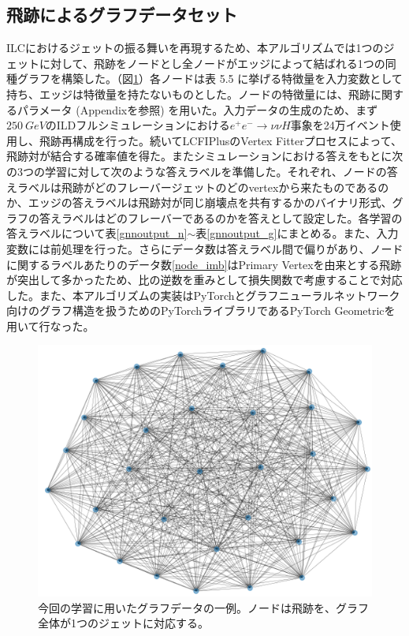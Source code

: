 \subsection{飛跡によるグラフデータセット}
ILCにおけるジェットの振る舞いを再現するため、本アルゴリズムでは1つのジェットに対して、飛跡をノードとし全ノードがエッジによって結ばれる1つの同種グラフを構築した。（図\ref{1graph}）各ノードは表 5.5%
に挙げる特徴量を入力変数として持ち、エッジは特徴量を持たないものとした。ノードの特徴量には、飛跡に関するパラメータ (Appendixを参照) を用いた。入力データの生成のため、まず$\SI{250}{GeV}$のILDフルシミュレーションにおける$e^+e^- \rightarrow \nu \nu H$事象を24万イベント使用し、飛跡再構成を行った。続いてLCFIPlusのVertex Fitterプロセスによって、飛跡対が結合する確率値を得た。またシミュレーションにおける答えをもとに次の3つの学習に対して次のような答えラベルを準備した。それぞれ、ノードの答えラベルは飛跡がどのフレーバージェットのどのvertexから来たものであるのか、エッジの答えラベルは飛跡対が同じ崩壊点を共有するかのバイナリ形式、グラフの答えラベルはどのフレーバーであるのかを答えとして設定した。各学習の答えラベルについて表\ref{gnnoutput_n}$\sim$表\ref{gnnoutput_g}にまとめる。また、入力変数には前処理を行った。さらにデータ数は答えラベル間で偏りがあり、ノードに関するラベルあたりのデータ数\ref{node_imb}はPrimary Vertexを由来とする飛跡が突出して多かったため、比の逆数を重みとして損失関数で考慮することで対応した。また、本アルゴリズムの実装はPyTorchとグラフニューラルネットワーク向けのグラフ構造を扱うためのPyTorchライブラリであるPyTorch Geometricを用いて行なった。
\begin{figure}[H]
	\begin{center}
 \includegraphics[keepaspectratio, scale=0.5]
 	{Figure/Flavortagging/graphexample.png}
 		\caption{今回の学習に用いたグラフデータの一例。ノードは飛跡を、グラフ全体が1つのジェットに対応する。}
 		\label{1graph}
	\end{center}
\end{figure}

